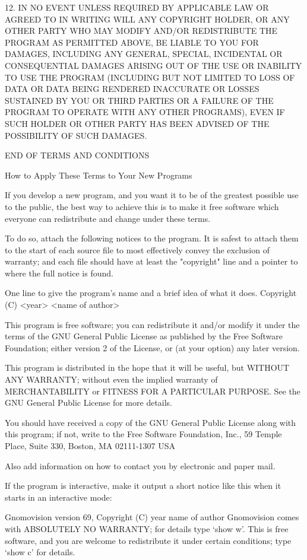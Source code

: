 12. IN NO EVENT UNLESS REQUIRED BY APPLICABLE LAW OR AGREED TO IN WRITING WILL ANY COPYRIGHT HOLDER, OR ANY OTHER PARTY WHO MAY MODIFY AND/OR REDISTRIBUTE THE PROGRAM AS PERMITTED ABOVE, BE LIABLE TO YOU FOR DAMAGES, INCLUDING ANY GENERAL, SPECIAL, INCIDENTAL OR CONSEQUENTIAL DAMAGES ARISING OUT OF THE USE OR INABILITY TO USE THE PROGRAM (INCLUDING BUT NOT LIMITED TO LOSS OF DATA OR DATA BEING RENDERED INACCURATE OR LOSSES SUSTAINED BY YOU OR THIRD PARTIES OR A FAILURE OF THE PROGRAM TO OPERATE WITH ANY OTHER PROGRAMS), EVEN IF SUCH HOLDER OR OTHER PARTY HAS BEEN ADVISED OF THE POSSIBILITY OF SUCH DAMAGES.

END OF TERMS AND CONDITIONS

How to Apply These Terms to Your New Programs

If you develop a new program, and you want it to be of the greatest possible use to the public, the best way to achieve this is to make it free software which everyone can redistribute and change under these terms.

To do so, attach the following notices to the program. It is safest to attach them to the start of each source file to most effectively convey the exclusion of warranty; and each file should have at least the "copyright" line and a pointer to where the full notice is found.

One line to give the program's name and a brief idea of what it does.
Copyright (C) <year> <name of author>

This program is free software; you can redistribute it and/or modify it under the terms of the GNU General Public License as published by the Free Software Foundation; either version 2 of the License, or (at your option) any later version.

This program is distributed in the hope that it will be useful, but WITHOUT ANY WARRANTY; without even the implied warranty of MERCHANTABILITY or FITNESS FOR A PARTICULAR PURPOSE. See the GNU General Public License for more details.

You should have received a copy of the GNU General Public License along with this program; if not, write to the Free Software Foundation, Inc., 59 Temple Place, Suite 330, Boston, MA 02111-1307 USA

Also add information on how to contact you by electronic and paper mail.

If the program is interactive, make it output a short notice like this when it starts in an interactive mode:

Gnomovision version 69, Copyright (C) year name of author Gnomovision comes with ABSOLUTELY NO WARRANTY; for details type `show w'. This is free software, and you are welcome to redistribute it under certain conditions; type `show c' for details.

